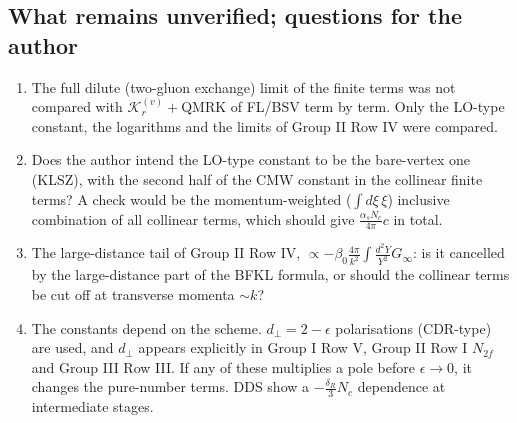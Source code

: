 \subsection{What remains unverified; questions for the author}
\begin{enumerate}
\item The full dilute (two-gluon exchange) limit of the finite terms was not compared with $\mathcal K^{(v)}_{r}+$QMRK of FL/BSV term by term. Only the LO-type constant, the logarithms and the limits of Group II Row IV were compared.
\item Does the author intend the LO-type constant to be the bare-vertex one (KLSZ), with the second half of the CMW constant in the collinear finite terms? A check would be the momentum-weighted ($\int d\xi\,\xi$) inclusive combination of all collinear terms, which should give $\frac{\alpha_{s}N_{c}}{4\pi}c$ in total.
\item The large-distance tail of Group II Row IV, $\propto-\beta_{0}\frac{4\pi}{k^{2}}\int\frac{d^{2}Y}{Y^{2}}G_{\infty}$: is it cancelled by the large-distance part of the BFKL formula, or should the collinear terms be cut off at transverse momenta $\sim k$?
\item The constants depend on the scheme. $d_{\perp}=2-\epsilon$ polarisations (CDR-type) are used, and $d_{\perp}$ appears explicitly in Group I Row V, Group II Row I $N_{2f}$ and Group III Row III. If any of these multiplies a pole before $\epsilon\to0$, it changes the pure-number terms. DDS show a $-\frac{\delta_{R}}{3}N_{c}$ dependence at intermediate stages.
\end{enumerate}
